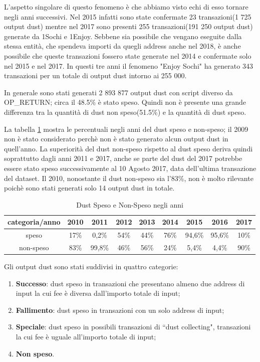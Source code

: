 L'aspetto singolare di questo fenomeno è che abbiamo visto echi di esso tornare negli anni successivi. Nel 2015 infatti sono state confermate 23 transazioni(1 725 output dust) mentre nel 2017 sono presenti 255 transazioni(191 250 output dust) generate da 1Sochi e 1Enjoy. Sebbene sia possibile che vengano eseguite dalla stessa entità, che spendeva importi da quegli address anche nel 2018, è anche possibile che queste transazioni fossero state generate nel 2014 e confermate solo nel 2015 e nel 2017. In questi tre anni il fenomeno "Enjoy Sochi" ha generato 343 transazioni per un totale di output dust intorno ai 255 000.

In generale sono stati generati 2 893 877 output dust con script diverso da OP\_RETURN; circa il 48.5\% è stato speso. Quindi non è presente una grande differenza tra la quantità di dust non speso(51.5\%) e la quantità di dust speso. 

La tabella \ref{tab:dust_spent_unspent} mostra le percentuali negli anni del dust speso e non-speso; il 2009 non è stato considerato perchè non è stato generato alcun output dust in quell'anno. La superiorità del dust non-speso rispetto al dust speso deriva quindi soprattutto dagli anni 2011 e 2017, anche se parte del dust del 2017 potrebbe essere stato speso successivamente al 10 Agosto 2017, data dell'ultima transazione del dataset. Il 2010, nonostante il dust non-speso sia l'83\%, non è molto rilevante poichè sono stati generati solo 14 output dust in totale. 
\begin{table}[H]
    \centering
    \begin{tabular}{|c|c|c|c|c|c|c|c|c|}
        \hline
           categoria/anno   & 2010 & 2011 & 2012 & 2013 & 2014 & 2015 & 2016 & 2017\\
        \hline 
         speso &  17\% & 0,2\% & 54\% & 44\% & 76\% & 94,6\% & 95,6\% & 10\% \\
         \hline
         non-speso & 83\% & 99,8\% & 46\% & 56\% & 24\% & 5,4\% & 4,4\% & 90\%  \\
         \hline
    \end{tabular}
    \caption{Dust Speso e Non-Speso negli anni}
    \label{tab:dust_spent_unspent}
\end{table}
Gli output dust sono stati suddivisi in quattro categorie:
\begin{enumerate}
    \item \textbf{Successo}: dust speso in transazioni che presentano almeno due address di input la cui fee è diversa dall'importo totale di input;
    \item \textbf{Fallimento}: dust speso in transazioni con un solo address di input;
    \item \textbf{Speciale}: dust speso in possibili transazioni di ``dust collecting", transazioni la cui fee è uguale all'importo totale di input;
    \item \textbf{Non speso}.
\end{enumerate}

